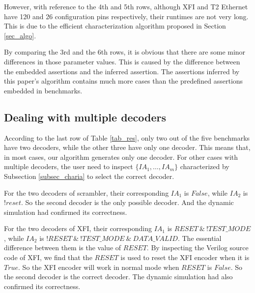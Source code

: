 \documentclass[journal]{IEEEtran}
\begin{document}
However,
with reference to the 4th and 5th rows,
although XFI and T2 Ethernet have 120 and 26 configuration pins respectively,
their runtimes are not very long.
This is due to the efficient characterization algorithm proposed in Section \ref{sec_algo}.

By comparing the 3rd and the 6th rows,
it is obvious that there are some minor differences in those parameter values.
This is caused by the difference between the embedded assertions and the inferred assertion.
The assertions inferred by this paper's algorithm contains much more cases than the predefined assertions embedded in benchmarks.



\subsection{Dealing with multiple decoders}\label{subsec_exp_muldec}
According to the last row of Table \ref{tab_res},
only two out of the five benchmarks have two decoders,
while the other three have only one decoder.
This means that,
in most cases,
our algorithm generates only one decoder.
For other cases with multiple decoders,
the user need to inspect $\{IA_1,\dots,IA_{m}\}$ characterized by Subsection \ref{subsec_charia} to select the correct decoder.

For the two decoders of scrambler,
their corresponding $IA_1$ is $False$,
while $IA_2$ is $!reset$.
So the second decoder is the only possible decoder.
And the dynamic simulation had confirmed its correctness.

For the two decoders of XFI,
their corresponding $IA_1$ is $RESET~\&~!TEST\_MODE$,
while $IA_2$ is $!RESET~\&~!TEST\_MODE~\&~DATA\_VALID$.
The essential difference between them is the value of $RESET$.
By inspecting the Verilog source code of XFI,
we find that the $RESET$ is used to reset the XFI encoder when it is $True$.
So the XFI encoder will work in normal mode when $RESET$ is $False$.
So the second decoder is the correct decoder.
The dynamic simulation had also confirmed its correctness.



\end{document}
